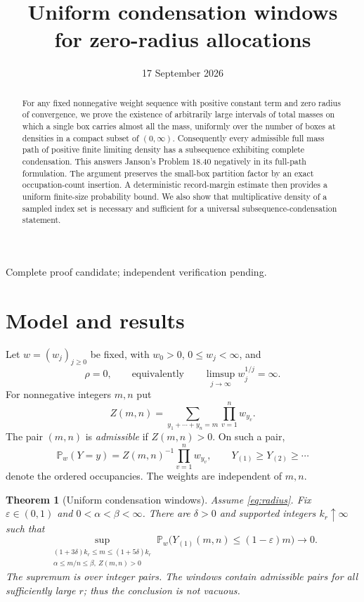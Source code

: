 \documentclass[11pt]{article}
\title{Uniform condensation windows\protect\\for zero-radius allocations}
\author{}
\date{17 September 2026}
\newtheorem{theorem}{Theorem}
\theoremstyle{remark}\newtheorem{remark}[theorem]{Remark}
\newcommand{\Pp}{\mathbb P}
\begin{document}
\maketitle
\vspace{-1.5em}
\begin{center}\small Complete proof candidate; independent verification pending.\end{center}
\begin{abstract}
For any fixed nonnegative weight sequence with positive constant term and
zero radius of convergence, we prove the existence of arbitrarily large
intervals of total masses on which a single box carries almost all the mass,
uniformly over the number of boxes at densities in a compact subset of
$(0,\infty)$. Consequently every admissible full mass path of positive finite
limiting density has a subsequence exhibiting complete condensation. This
answers Janson's Problem 18.40 negatively in its full-path formulation.
The argument preserves the small-box partition factor by an exact
occupation-count insertion. A deterministic record-margin estimate then
provides a uniform finite-size probability bound. We also show that
multiplicative density of a sampled index set is necessary and sufficient
for a universal subsequence-condensation statement.
\end{abstract}

\section{Model and results}
Let $w=(w_j)_{j\ge0}$ be fixed, with $w_0>0$, $0\le w_j<\infty$, and
\begin{equation}\label{eq:radius}
 \rho=0,\qquad\text{equivalently}\qquad
 \limsup_{j\to\infty}w_j^{1/j}=\infty.
\end{equation}
For nonnegative integers $m,n$ put
\[
 Z(m,n)=\sum_{y_1+\cdots+y_n=m}\prod_{v=1}^n w_{y_v}.
\]
The pair $(m,n)$ is \emph{admissible} if $Z(m,n)>0$. On such a pair,
\[
 \Pp_w(Y=y)=Z(m,n)^{-1}\prod_{v=1}^n w_{y_v},
 \qquad Y_{(1)}\ge Y_{(2)}\ge\cdots
\]
denote the ordered occupancies. The weights are independent of $m,n$.

\begin{theorem}[Uniform condensation windows]\label{thm:windows}
Assume \eqref{eq:radius}. Fix $\varepsilon\in(0,1)$ and
$0<\alpha<\beta<\infty$. There are $\delta>0$ and supported integers
$k_r\uparrow\infty$ such that
\begin{equation}\label{eq:uniform}
 \sup_{\substack{(1+3\delta)k_r\le m\le(1+5\delta)k_r\\
                  \alpha\le m/n\le\beta,\ Z(m,n)>0}}
 \Pp_w\bigl(Y_{(1)}(m,n)\le(1-\varepsilon)m\bigr)
 \longrightarrow0.
\end{equation}
The supremum is over integer pairs. The windows contain admissible pairs
for all sufficiently large $r$; thus the conclusion is not vacuous.
\end{theorem}
\end{document}
